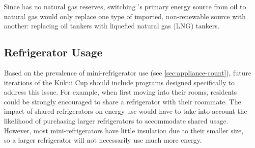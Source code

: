 Since \Hawaii has no natural gas reserves, switching \Hawaii's primary energy source from oil to natural gas would only replace one type of imported, non-renewable source with another: replacing oil tankers with liquefied natural gas (LNG) tankers.


\subsection{Refrigerator Usage}

Based on the prevalence of mini-refrigerator use (see \autoref{sec:appliance-count}), future iterations of the Kukui Cup should include programs designed specifically to address this issue. For example, when first moving into their rooms, residents could be strongly encouraged to share a refrigerator with their roommate. The impact of shared refrigerators on energy use would have to take into account the likelihood of purchasing larger refrigerators to accommodate shared usage. However, most mini-refrigerators have little insulation due to their smaller size, so a larger refrigerator will not necessarily use much more energy.
